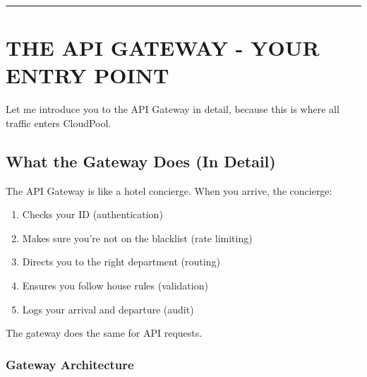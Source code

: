 \documentclass[11pt,a4paper]{report}
\begin{document}
\vfill\hrule\vfill



\part{THE API GATEWAY - YOUR ENTRY POINT}


Let me introduce you to the API Gateway in detail, because this is where all traffic enters CloudPool.


\chapter{What the Gateway Does (In Detail)}


The API Gateway is like a hotel concierge. When you arrive, the concierge:
\begin{enumerate}
\item Checks your ID (authentication)
\item Makes sure you're not on the blacklist (rate limiting)
\item Directs you to the right department (routing)
\item Ensures you follow house rules (validation)
\item Logs your arrival and departure (audit)

\end{enumerate}
The gateway does the same for API requests.


\section{Gateway Architecture}
\end{document}
